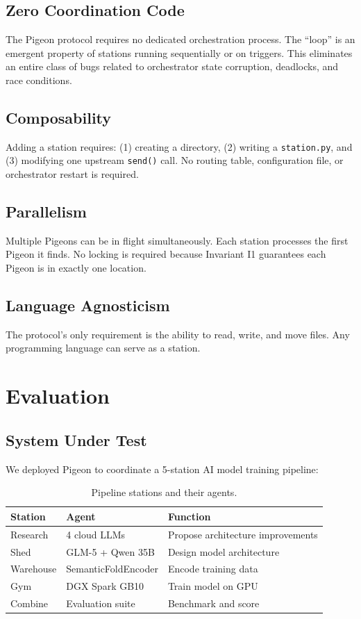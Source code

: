 \documentclass[11pt,a4paper]{article}
\begin{document}
\subsection{Zero Coordination Code}

The Pigeon protocol requires no dedicated orchestration process. The ``loop'' is an emergent property of stations running sequentially or on triggers. This eliminates an entire class of bugs related to orchestrator state corruption, deadlocks, and race conditions.

\subsection{Composability}

Adding a station requires: (1) creating a directory, (2) writing a \texttt{station.py}, and (3) modifying one upstream \texttt{send()} call. No routing table, configuration file, or orchestrator restart is required.

\subsection{Parallelism}

Multiple Pigeons can be in flight simultaneously. Each station processes the first Pigeon it finds. No locking is required because Invariant I1 guarantees each Pigeon is in exactly one location.

\subsection{Language Agnosticism}

The protocol's only requirement is the ability to read, write, and move files. Any programming language can serve as a station.

\section{Evaluation}

\subsection{System Under Test}

We deployed Pigeon to coordinate a 5-station AI model training pipeline:

\begin{table}[h]
\centering
\begin{tabular}{llp{5cm}}
\toprule
\textbf{Station} & \textbf{Agent} & \textbf{Function} \\
\midrule
Research & 4 cloud LLMs & Propose architecture improvements \\
Shed & GLM-5 + Qwen 35B & Design model architecture \\
Warehouse & SemanticFoldEncoder & Encode training data \\
Gym & DGX Spark GB10 & Train model on GPU \\
Combine & Evaluation suite & Benchmark and score \\
\bottomrule
\end{tabular}
\caption{Pipeline stations and their agents.}
\end{table}
\end{document}
